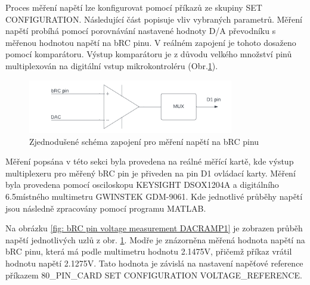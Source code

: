Proces měření napětí lze konfigurovat pomocí příkazů ze skupiny SET CONFIGURATION. Následující část popisuje vliv vybraných parametrů.
Měření napětí probíhá pomocí porovnávání nastavené hodnoty D/A převodníku s měřenou hodnotou napětí na bRC pinu. V reálném zapojení je tohoto dosaženo pomocí komparátoru.
Výstup komparátoru je z důvodu velkého množství pinů multiplexován na digitální vstup mikrokontroléru (Obr.\ref{fig: bRC pin voltage measurement}). 
\begin{figure}[ht!]
    \centering
    \includegraphics[width = 0.8\textwidth]{obrazky/Voltage_measurement_example.png}
    \caption{Zjednodušené schéma zapojení pro měření napětí na bRC pinu}
    \label{fig: bRC pin voltage measurement}
\end{figure}
Měření popsána v této sekci byla provedena na reálné měřící kartě, kde výstup multiplexeru pro měřený bRC pin je přiveden na pin D1 ovládací karty. Měření byla provedena pomocí
osciloskopu KEYSIGHT DSOX1204A a digitálního 6.5místného multimetru GWINSTEK GDM-9061.
Kde jednotlivé průběhy napětí jsou následně zpracovány pomocí programu MATLAB.\par

Na obrázku \ref{fig: bRC pin voltage measurement DACRAMP1} je zobrazen průběh napětí jednotlivých uzlů z obr. \ref{fig: bRC pin voltage measurement}. Modře je znázorněna měřená hodnota napětí na bRC pinu,
která má podle multimetru hodnotu 2.1475V, přičemž příkaz vrátil hodnotu napětí 2.1275V.
Tato hodnota je závislá na nastavení napěťové reference příkazem 80\_PIN\_CARD SET CONFIGURATION VOLTAGE\_REFERENCE.\par

